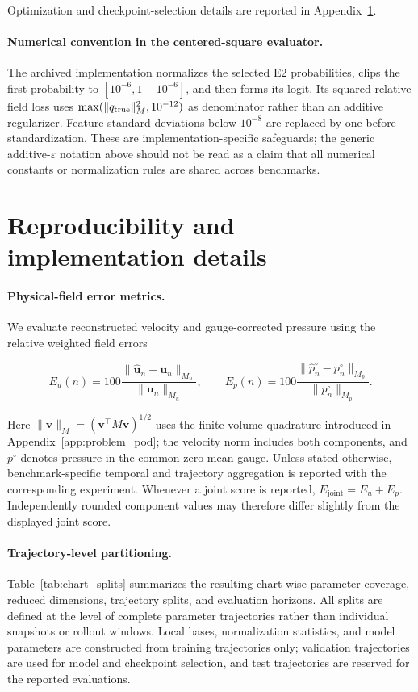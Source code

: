 \documentclass{article}
\begin{document}
Optimization and checkpoint-selection details are reported in
Appendix~\ref{app:implementation}.

\paragraph{Numerical convention in the centered-square evaluator.}
The archived implementation normalizes the selected E2 probabilities, clips the first probability to $[10^{-6},1-10^{-6}]$, and then forms its logit. Its squared relative field loss uses $\max(\|q_{\rm true}\|_M^2,10^{-12})$ as denominator rather than an additive regularizer. Feature standard deviations below $10^{-8}$ are replaced by one before standardization. These are implementation-specific safeguards; the generic additive-$\varepsilon$ notation above should not be read as a claim that all numerical constants or normalization rules are shared across benchmarks.

\section{Reproducibility and implementation details}
\label{app:implementation}

\paragraph{Physical-field error metrics.}
We evaluate reconstructed velocity and gauge-corrected pressure using the relative weighted field errors


\begin{equation}
E_u(n)
=
100\frac{
\|\widehat{\bm u}_n-\bm u_n\|_{M_u}
}{
\|\bm u_n\|_{M_u}
},
\qquad
E_p(n)
=
100\frac{
\|\widehat p_n^\circ-p_n^\circ\|_{M_p}
}{
\|p_n^\circ\|_{M_p}
}.
\label{eq:field_errors}
\end{equation}


Here $\|\bm v\|_M=(\bm v^\top M\bm v)^{1/2}$ uses the finite-volume
quadrature introduced in Appendix~\ref{app:problem_pod}; the velocity norm includes both components, and $p^\circ$ denotes pressure in the common zero-mean gauge. Unless stated otherwise, benchmark-specific temporal and trajectory aggregation is reported with the corresponding experiment. Whenever a joint score is reported,
$E_{\mathrm{joint}}=E_u+E_p$. Independently rounded component values may therefore differ slightly from the displayed joint score.


\paragraph{Trajectory-level partitioning.}
Table~\ref{tab:chart_splits} summarizes the resulting chart-wise parameter coverage, reduced dimensions, trajectory splits, and evaluation horizons. All splits are defined at the level of complete parameter trajectories rather than individual snapshots or rollout windows. Local bases, normalization statistics, and model parameters are constructed from training trajectories only; validation trajectories are used for model and checkpoint selection, and test trajectories are reserved for the reported evaluations. 
\end{document}
